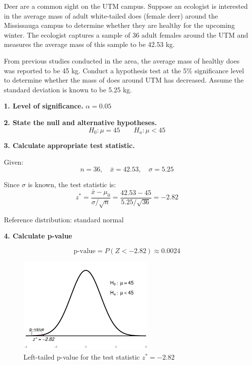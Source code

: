 \begin{example}
Deer are a common sight on the UTM campus. Suppose an ecologist is interested in the average mass of adult white-tailed does (female deer) around the Mississauga campus to determine whether they are healthy for the upcoming winter. The ecologist captures a sample of 36 adult females around the UTM and measures the average mass of this sample to be 42.53 kg.

From previous studies conducted in the area, the average mass of healthy does was reported to be 45 kg. Conduct a hypothesis test at the 5\% significance level to determine whether the mass of does around UTM has decreased. Assume the standard deviation is known to be 5.25 kg.


\vspace{1em}

\textbf{1. Level of significance.} \(\alpha = 0.05\)

\textbf{2. State the null and alternative hypotheses.}
\[
H_0: \mu = 45 \qquad H_a: \mu < 45
\]

\textbf{3. Calculate appropriate test statistic.}

\vspace{0.5em}

Given:
\[
n = 36, \quad \bar{x} = 42.53, \quad \sigma = 5.25
\]

Since \(\sigma\) is known, the test statistic is:
\[
z^* = \frac{\bar{x} - \mu_0}{\sigma / \sqrt{n}} = \frac{42.53 - 45}{5.25/\sqrt{36}} = -2.82
\]

Reference distribution: standard normal

\textbf{4. Calculate p-value}

\[
\text{p-value} = P(Z < -2.82) \approx 0.0024
\]

\captionsetup{skip=0pt} %
\begin{figure}[H]
\centering
\includegraphics[width=0.6\textwidth]{section11/images/deer_pvalue.pdf}
\caption{Left-tailed p-value for the test statistic \( z^* = -2.82 \)}
\end{figure}


\end{example}
